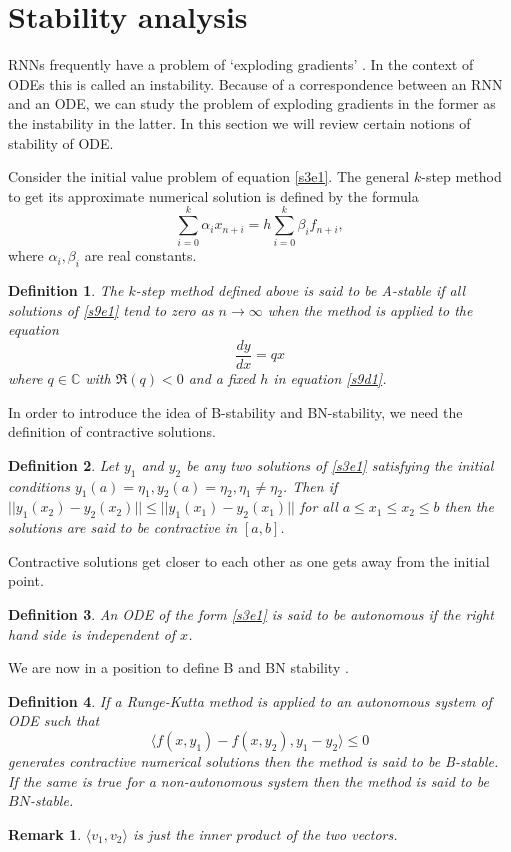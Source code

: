 \documentclass{article}
\numberwithin{equation}{section}
\newtheorem{defn}{Definition}
\newtheorem*{rem}{Remark}
\begin{document}
\section{Stability analysis}\label{s9}
RNNs frequently have a problem of `exploding gradients'
\cite{gereon2018hands}. In the context of ODEs this is called an 
instability. Because of a correspondence between an RNN and an ODE, we 
can study the problem of exploding gradients in the former as the 
instability in the latter. In this section we will review certain notions
of stability of ODE.

Consider the initial value problem of equation \eqref{s3e1}. The general
$k$-step method to get its approximate numerical solution is defined by
the formula\cite{dahlquist1963special}
\begin{equation}\label{s9e1}
\sum_{i=0}^k \alpha_i x_{n+i} = h\sum_{i=0}^k \beta_i f_{n+i},
\end{equation}
where $\alpha_i, \beta_i$ are real constants.
\begin{defn}\label{s9d1}
The $k$-step method defined above is said to be A-stable
\cite{dahlquist1963special} if all solutions of \eqref{s9e1} tend to zero 
as $n \rightarrow \infty$ when the method is applied to the equation
\[
    \frac{dy}{dx} = qx
\]
where $q \in \mathbb{C}$ with $\Re(q) < 0$ and a fixed $h$ in equation
\eqref{s9d1}.
\end{defn}

In order to introduce the idea of B-stability and BN-stability, we need
the definition of contractive solutions\cite{lambert1991numerical}.
\begin{defn}\label{s9d2}
Let $y_1$ and $y_2$ be any two solutions of \eqref{s3e1} satisfying the
initial conditions $y_1(a) = \eta_1, y_2(a) = \eta_2, \eta_1 \ne \eta_2$.
Then if $||y_1(x_2) - y_2(x_2)|| \le ||y_1(x_1) - y_2(x_1)||$ for all
$a \le x_1 \le x_2 \le b$ then the solutions are said to be contractive
in $[a, b]$.
\end{defn}
Contractive solutions get closer to each other as one gets away from
the initial point.

\begin{defn}\label{s9d3}
An ODE of the form \eqref{s3e1} is said to be autonomous if the right hand
side is independent of $x$.
\end{defn}

We are now in a position to define B and BN stability
\cite{lambert1991numerical}.
\begin{defn}\label{s9d4}
If a Runge-Kutta method is applied to an autonomous system of ODE such that
\[
    \langle f(x, y_1) - f(x, y_2), y_1 - y_2\rangle \le 0
\]
generates contractive numerical solutions then the method is said to be
B-stable. If the same is true for a non-autonomous system then the method
is said to be $BN$-stable.
\end{defn}
\begin{rem}
$\langle v_1, v_2 \rangle$ is just the inner product of the two vectors.
\end{rem}
\end{document}
